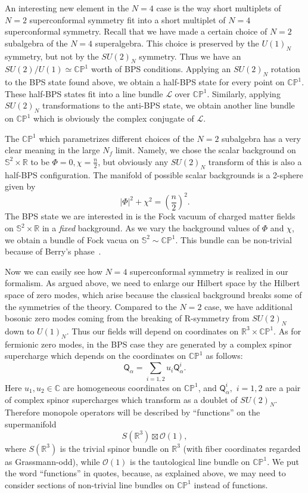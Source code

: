 \documentclass[a4paper,12pt, amsfonts, amssymb]{article}
\newcommand{\CC}{{\mathbb C}}
\newcommand{\RR}{{\mathbb R}}
\newcommand{\PP}{{\mathbb P}}
\renewcommand{\SS}{{\mathbb S}}
\renewcommand{\L}{{\mathcal L}}
\newcommand{\Q}{{\mathsf Q}}
\begin{document}
An interesting new element in the $N=4$ case is the way short
multiplets of $N=2$ superconformal symmetry fit into a short multiplet
of $N=4$ superconformal symmetry. Recall that we have made a certain
choice of $N=2$ subalgebra of the $N=4$ superalgebra. 
This choice is preserved by the $U(1)_N$ symmetry, but not by the 
$SU(2)_N$ symmetry. Thus we have an $SU(2)/U(1)\simeq \CC\PP^1$ worth of BPS conditions. Applying an $SU(2)_N$ rotation to the BPS state found above, we obtain a half-BPS state for every point on $\CC\PP^1$. These half-BPS states
fit into a line bundle $\L$ over $\CC\PP^1$. Similarly, applying $SU(2)_N$
transformations to the anti-BPS state, we obtain another line bundle
on $\CC\PP^1$ which is obviously the complex conjugate of $\L$.

The $\CC\PP^1$ which parametrizes different choices of the $N=2$
subalgebra has a very clear meaning in the large $N_f$ limit. Namely,
we chose the scalar background on $\SS^2\times\RR$ to be 
$\Phi=0,\chi=\frac{n}{2}$, but obviously any $SU(2)_N$
transform of this is also a half-BPS configuration. The manifold
of possible scalar backgrounds is a 2-sphere given by
$$
|\Phi|^2+\chi^2=\left(\frac{n}{2}\right)^2.
$$
The BPS state we
are interested in is the Fock vacuum of charged
matter fields on $\SS^2\times\RR$ in a {\it fixed} background. 
As we vary the background
values of $\Phi$ and $\chi$, we obtain a bundle of Fock vacua on 
$\SS^2\sim\CC\PP^1.$ This bundle can be non-trivial because of Berry's phase~\cite{Berry,Simon}.

Now we can easily see how $N=4$ superconformal symmetry is realized
in our formalism. As argued above, we need to enlarge our Hilbert
space by the Hilbert space of zero modes, which arise because the
classical background breaks some of the symmetries of the theory.
Compared to the $N=2$ case, we have additional bosonic zero modes
coming from the breaking of R-symmetry from $SU(2)_N$ down to $U(1)_N$.
Thus our fields will depend on coordinates on $\RR^3\times \CC\PP^1$.
As for fermionic zero modes, in the BPS case they are generated by a complex
spinor supercharge which depends on the coordinates on $\CC\PP^1$
as follows:
$$
\Q_\alpha=\sum_{i=1,2} u_i \Q^i_\alpha.
$$
Here $u_1,u_2\in \CC$ are homogeneous coordinates on $\CC\PP^1$,
and $\Q^i_\alpha,$ $i=1,2$ are a pair of complex spinor supercharges
which transform as a doublet of $SU(2)_N$. Therefore monopole
operators will be described by ``functions'' on the
supermanifold
$$
S(\RR^3)\boxtimes {\mathcal O}(1),
$$
where $S(\RR^3)$ is the trivial spinor bundle on 
$\RR^3$ (with fiber coordinates regarded as Grassmann-odd), while 
${\mathcal O}(1)$ is the tautological line bundle 
on $\CC\PP^1$. We put the word ``functions'' in quotes, because, as explained above, we may need to consider sections of non-trivial line bundles on $\CC\PP^1$ instead of functions.
\end{document}
